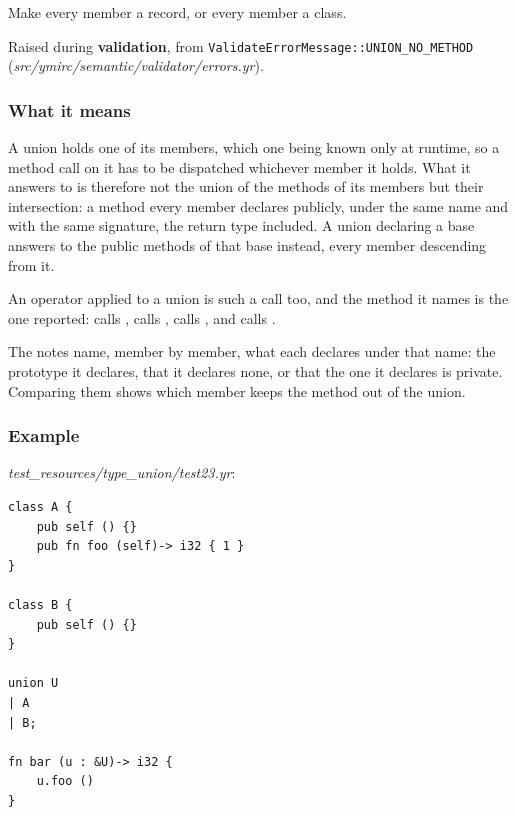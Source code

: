 Make every member a record, or every member a class.

\label{sec:codes:e4312}

Raised during \textbf{validation}, from \texttt{ValidateErrorMessage::\allowbreak{}UNION\_\allowbreak{}NO\_\allowbreak{}METHOD} (\textit{src/\allowbreak{}ymirc/\allowbreak{}semantic/\allowbreak{}validator/\allowbreak{}errors.yr}).

\subsubsection*{What it means}

A union holds one of its members, which one being known only at runtime, so a method call on it has to be dispatched whichever member it holds. What it answers to is therefore not the union of the methods of its members but their intersection: a method every member declares publicly, under the same name and with the same signature, the return type included. A union declaring a base answers to the public methods of that base instead, every member descending from it.

An operator applied to a union is such a call too, and the method it names is the one reported:  calls ,  calls ,  calls , and  calls .

The notes name, member by member, what each declares under that name: the prototype it declares, that it declares none, or that the one it declares is private. Comparing them shows which member keeps the method out of the union.

\subsubsection*{Example}

\textit{test\_\allowbreak{}resources/\allowbreak{}type\_\allowbreak{}union/\allowbreak{}test23.yr}:

\begin{lstlisting}[style=coloredverbatimError]
class A {
    pub self () {}
    pub fn foo (self)-> i32 { 1 }
}

class B {
    pub self () {}
}

union U
| A
| B;

fn bar (u : &U)-> i32 {
    u.foo ()
}
\end{lstlisting}

